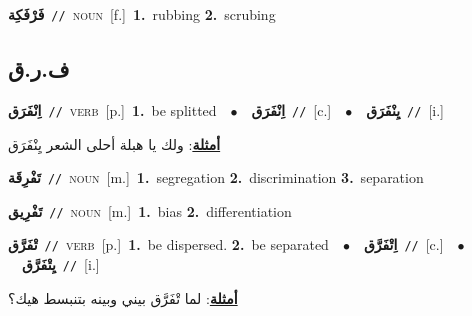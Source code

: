 \documentclass[10pt,a4paper,twoside]{article} %
\begin{document}
\begin{multicols}{2}
{\setlength\topsep{0pt}\textbf{\foreignlanguage{arabic}{فَرْفَكِة}}\ {\color{gray}\texttt{//}\color{black}}\ \textsc{noun}\ [f.]\ \textbf{1.}~rubbing  \textbf{2.}~scrubing\ } \vspace{2mm}

\vspace{-3mm}
\subsection*{\color{blue}\foreignlanguage{arabic}{ف.ر.ق}\color{blue}{}} 

{\setlength\topsep{0pt}\textbf{\foreignlanguage{arabic}{اِنْفَرَق}}\ {\color{gray}\texttt{//}\color{black}}\ \textsc{verb}\ [p.]\ \textbf{1.}~be splitted\ \ $\bullet$\ \ \setlength\topsep{0pt}\textbf{\foreignlanguage{arabic}{اِنْفَرَق}}\ {\color{gray}\texttt{//}\color{black}}\ [c.]\ \ $\bullet$\ \ \setlength\topsep{0pt}\textbf{\foreignlanguage{arabic}{يِنْفَرَق}}\ {\color{gray}\texttt{//}\color{black}}\ [i.]\  \begin{flushright}\color{gray}\foreignlanguage{arabic}{\textbf{\underline{\foreignlanguage{arabic}{أمثلة}}}: ولك يا هبلة أحلى الشعر يِنْفَرَق}\end{flushright}\color{black}} \vspace{2mm}

{\setlength\topsep{0pt}\textbf{\foreignlanguage{arabic}{تَفْرِقَة}}\ {\color{gray}\texttt{//}\color{black}}\ \textsc{noun}\ [m.]\ \textbf{1.}~segregation  \textbf{2.}~discrimination  \textbf{3.}~separation\ } \vspace{2mm}

{\setlength\topsep{0pt}\textbf{\foreignlanguage{arabic}{تَفْرِيق}}\ {\color{gray}\texttt{//}\color{black}}\ \textsc{noun}\ [m.]\ \textbf{1.}~bias  \textbf{2.}~differentiation\ } \vspace{2mm}

{\setlength\topsep{0pt}\textbf{\foreignlanguage{arabic}{تْفَرَّق}}\ {\color{gray}\texttt{//}\color{black}}\ \textsc{verb}\ [p.]\ \textbf{1.}~be dispersed.  \textbf{2.}~be separated\ \ $\bullet$\ \ \setlength\topsep{0pt}\textbf{\foreignlanguage{arabic}{اِتْفَرَّق}}\ {\color{gray}\texttt{//}\color{black}}\ [c.]\ \ $\bullet$\ \ \setlength\topsep{0pt}\textbf{\foreignlanguage{arabic}{يِتْفَرَّق}}\ {\color{gray}\texttt{//}\color{black}}\ [i.]\  \begin{flushright}\color{gray}\foreignlanguage{arabic}{\textbf{\underline{\foreignlanguage{arabic}{أمثلة}}}: لما تْفَرَّق بيني وبينه بتنبسط هيك؟}\end{flushright}\color{black}} \vspace{2mm}


\end{multicols}
\end{document}
